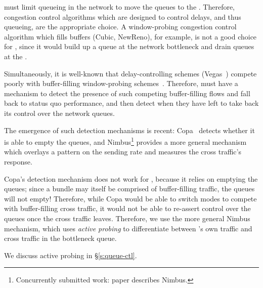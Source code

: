  \name must limit queueing in the network to move the queues to the \inbox. Therefore, congestion control algorithms which are designed to control delays, and thus queueing, are the appropriate choice. 
A window-probing congestion control algorithm which fills buffers (\eg Cubic, NewReno), for example, is not a good choice for \name, since it would build up a queue at the network bottleneck and drain queues at the \inbox.

 Simultaneously, it is well-known that delay-controlling schemes (\eg Vegas~\cite{vegas}) compete poorly with buffer-filling window-probing schemes~\cite{copa}.
Therefore, \name must have a mechanism to detect the presence of such competing buffer-filling flows and fall back to status quo performance, and then detect when they have left to take back its control over the network queues. 

The emergence of such detection mechanisms is recent: Copa~\cite{copa} detects whether it is able to empty the queues, and Nimbus\footnote{Concurrently submitted work: paper  describes Nimbus.} provides a more general mechanism which overlays a pattern on the sending rate and measures the cross traffic's response.

Copa's detection mechanism does not work for \name, because it relies on emptying the queues; since a bundle may itself be comprised of buffer-filling traffic, the queues will not empty! Therefore, while Copa would be able to switch modes to compete with buffer-filling cross traffic, it would not be able to re-assert control over the queues once the cross traffic leaves.
Therefore, we use the more general Nimbus mechanism, which uses \emph{active probing} to differentiate between \name's own traffic and cross traffic in the bottleneck queue.

We discuss active probing in \S\ref{s:queue-ctl}.
